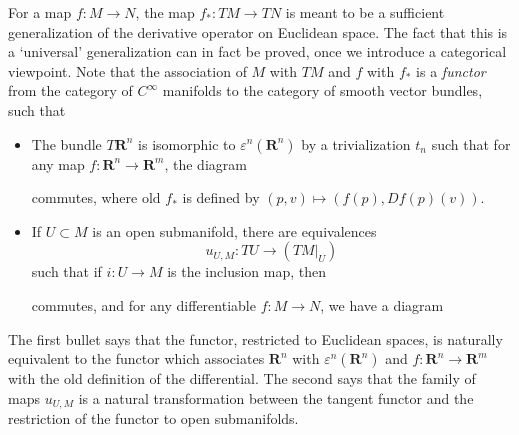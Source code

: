 For a map $f:M \to N$, the map $f_*: TM \to TN$ is meant to be a sufficient generalization of the derivative operator on Euclidean space. The fact that this is a `universal' generalization can in fact be proved, once we introduce a categorical viewpoint. Note that the association of $M$ with $TM$ and $f$ with $f_*$ is a {\it functor} from the category of $C^\infty$ manifolds to the category of smooth vector bundles, such that
%
\begin{itemize}
    \item The bundle $T\mathbf{R}^n$ is isomorphic to $\varepsilon^n(\mathbf{R}^n)$ by a trivialization $t_n$ such that for any map $f: \mathbf{R}^n \to \mathbf{R}^m$, the diagram
    \begin{center}
    \end{center}
    commutes, where $\text{old $f_*$}$ is defined by $(p,v) \mapsto (f(p), Df(p)(v))$.
    \item If $U \subset M$ is an open submanifold, there are equivalences
    \[ u_{U,M}: TU \to (TM|_U) \]
    such that if $i: U \to M$ is the inclusion map, then
    \begin{center}
    \end{center}
    commutes, and for any differentiable $f:M \to N$, we have a diagram
    \begin{center}
    \end{center}
\end{itemize}
%
The first bullet says that the functor, restricted to Euclidean spaces, is naturally equivalent to the functor which associates $\mathbf{R}^n$ with $\varepsilon^n(\mathbf{R}^n)$ and $f: \mathbf{R}^n \to \mathbf{R}^m$ with the old definition of the differential. The second says that the family of maps $u_{U,M}$ is a natural transformation between the tangent functor and the restriction of the functor to open submanifolds.

